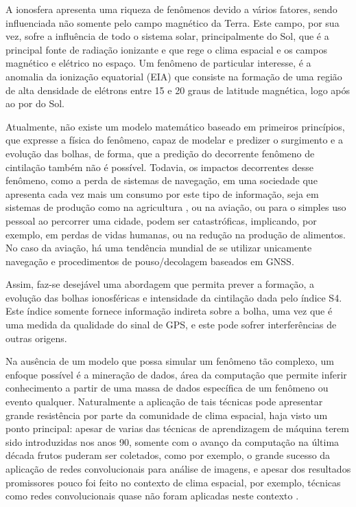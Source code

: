 A ionosfera apresenta uma riqueza de fenômenos devido a vários fatores, sendo influenciada não somente pelo campo magnético da Terra. Este campo, por sua vez, sofre a influência de todo o sistema solar, principalmente do Sol, que é a principal fonte de radiação ionizante e que rege o clima espacial e os campos magnético e elétrico no espaço. Um fenômeno de particular interesse, é a anomalia da ionização equatorial (EIA) que consiste na formação de uma região de alta densidade de elétrons entre 15 e 20 graus de latitude magnética, logo após ao por do Sol.

Atualmente, não existe um modelo matemático baseado em primeiros princípios, que expresse a física do fenômeno, capaz de modelar e predizer o surgimento e a evolução das bolhas, de forma, que a predição do decorrente fenômeno de cintilação também não é possível. Todavia, os impactos decorrentes desse fenômeno, como a perda de sistemas de navegação, em uma sociedade que apresenta cada vez mais um consumo por este tipo de informação, seja em sistemas de produção como na agricultura \cite{STAFFORD:2000}, ou na aviação, ou para o simples uso pessoal ao percorrer uma cidade, podem ser catastróficas, implicando, por exemplo, em perdas de vidas humanas, ou na redução na produção de alimentos. No caso da aviação, há uma tendência mundial de se utilizar unicamente navegação e procedimentos de pouso/decolagem baseados em GNSS.

Assim, faz-se desejável uma abordagem que permita prever a formação, a evolução das bolhas ionosféricas e intensidade da cintilação dada pelo índice S4. Este índice somente fornece informação indireta sobre a bolha, uma vez que é uma medida da qualidade do sinal de GPS, e este pode sofrer interferências de outras origens.

Na ausência de um modelo que possa simular um fenômeno tão complexo, um enfoque possível é a mineração de dados, área da computação que permite inferir conhecimento a partir de uma massa de dados específica de um fenômeno ou evento qualquer. Naturalmente a aplicação de tais técnicas pode apresentar grande resistência por parte da comunidade de clima espacial, haja visto um ponto principal: apesar de varias das técnicas de aprendizagem de máquina terem sido introduzidas nos anos 90, somente com o avanço da computação na última década frutos puderam ser coletados, como por exemplo, o grande sucesso da aplicação de redes convolucionais para análise de imagens, e apesar dos resultados promissores pouco foi feito no contexto de clima espacial, por exemplo, técnicas como redes convolucionais quase não foram aplicadas neste contexto \cite{CAMPOREALE:2019}.

